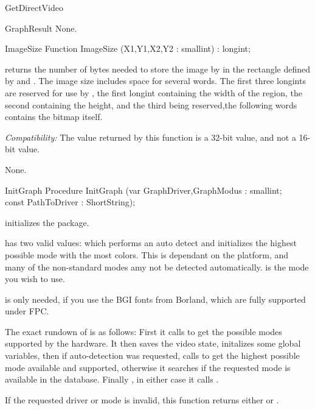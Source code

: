 \begin{function}{GetDirectVideo}
\begin{function}{GraphResult}
\Errors
None.
\SeeAlso
{}
\end{function}

\begin{function}{ImageSize}
\Declaration
Function ImageSize (X1,Y1,X2,Y2 : smallint) : longint;

\Description
{} returns the number of bytes needed to store the image
by  in the rectangle defined by  and .
The image size includes space for several words. The first three longints
are reserved for use by , the first longint containing the
width of the region, the second containing the height, and the third being
reserved,the following words contains the bitmap itself.

\textit{Compatibility:}
 The value returned by this function is a 32-bit value,
 and not a 16-bit value.

\Errors
None.
\SeeAlso
{}
\end{function}

\begin{procedure}{InitGraph}
\Declaration
Procedure InitGraph (var GraphDriver,GraphModus : smallint;\\
const PathToDriver : ShortString);

\Description

 initializes the  package.

 has two valid values:  which
performs an auto detect and initializes the highest possible mode with the most
colors. This is dependant on the platform, and many of the non-standard
modes amy not be detected automatically.  is the mode you
wish to use.

 is only needed, if you use the BGI fonts from
Borland, which are fully supported under FPC.

The exact rundown of  is as follows: First it calls
 to get the possible modes supported by the hardware.
It then saves the video state, initalizes some global variables, then if
auto-detection was requested, calls  to get the highest
possible mode available and supported, otherwise it searches if the requested
mode is available in the database. Finally , in either case it calls
.

If the requested driver or mode is invalid, this function returns either
 or .


\end{procedure}
\end{function}
